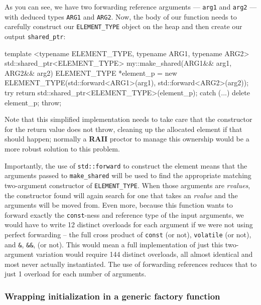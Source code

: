 \noindent As you can see, we have two forwarding reference arguments ---
\texttt{arg1} and \texttt{arg2} --- with deduced types \texttt{ARG1} and
\texttt{ARG2}. Now, the body of our function needs to carefully
construct our \texttt{ELEMENT\_TYPE} object on the heap and then create
our output \texttt{shared\_ptr}:

\begin{emcppslisting}
template <typename ELEMENT_TYPE, typename ARG1, typename ARG2>
std::shared_ptr<ELEMENT_TYPE> my::make_shared(ARG1&& arg1, ARG2&& arg2)
{
    ELEMENT_TYPE *element_p = new ELEMENT_TYPE(std::forward<ARG1>(arg1),
                                               std::forward<ARG2>(arg2));
    try
    {
        return std::shared_ptr<ELEMENT_TYPE>(element_p);
    }
    catch (...)
    {
        delete element_p;
        throw;
    }
}
\end{emcppslisting}

\noindent Note that this simplified implementation needs to take care that the
constructor for the return value does not throw, cleaning up the
allocated element if that should happen; normally a \textbf{RAII}
proctor to manage this ownership would be a more robust solution to this
problem.

Importantly, the use of \texttt{std::forward} to construct the element
means that the arguments passed to \texttt{make\_shared} will be used to
find the appropriate matching two-argument constructor of
\texttt{ELEMENT\_TYPE}. When those arguments are \emph{rvalues}, the
constructor found will again search for one that takes an \emph{rvalue}
and the arguments will be moved from. Even more, because this function
wants to forward exactly the \texttt{const}-ness and reference type of
the input arguments, we would have to write 12 distinct overloads for
each argument if we were not using perfect forwarding -- the full cross
product of \texttt{const} (or not), \texttt{volatile} (or not), and
\texttt{\&}, \texttt{\&\&}, (or not). This would mean a full
implementation of just this two-argument variation would require 144
distinct overloads, all almost identical and most never actually
instantiated. The use of forwarding references reduces that to just 1
overload for each number of arguments.

\subsubsection[Wrapping initialization in a generic factory function]{Wrapping initialization in a generic factory function}\label{wrapping-initialization-in-a-generic-factory-function}

